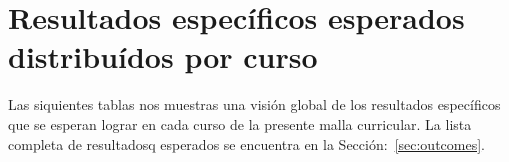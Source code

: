 \section{Resultados específicos esperados distribuídos por curso}\label{sec:specific-outcomes-by-course}
Las siquientes tablas nos muestras una visión global de los resultados específicos que se esperan lograr en cada 
curso de la presente malla curricular. 
La lista completa de resultadosq esperados se encuentra en la Sección:~\ref{sec:outcomes}.
